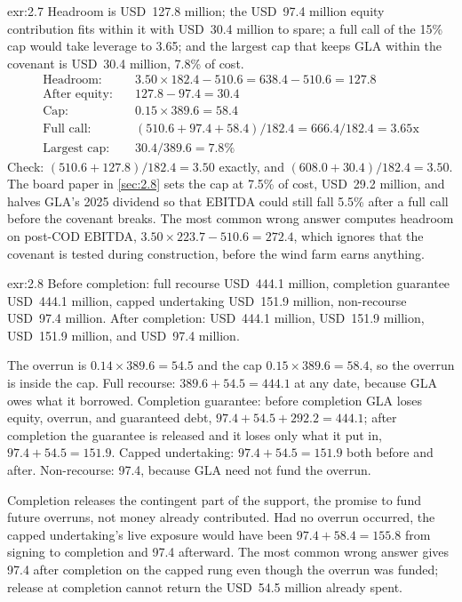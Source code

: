 \begin{solution}{exr:2.7}
Headroom is USD~127.8 million; the USD~97.4 million equity contribution fits within it with USD~30.4 million to spare; a full call of the 15\% cap would take leverage to 3.65\x; and the largest cap that keeps GLA within the covenant is USD~30.4 million, 7.8\% of cost.
\begin{align*}
\text{Headroom:}\quad & 3.50 \times 182.4 - 510.6 = 638.4 - 510.6 = 127.8\\
\text{After equity:}\quad & 127.8 - 97.4 = 30.4\\
\text{Cap:}\quad & 0.15 \times 389.6 = 58.4\\
\text{Full call:}\quad & (510.6 + 97.4 + 58.4)/182.4 = 666.4/182.4 = 3.65\text{x}\\
\text{Largest cap:}\quad & 30.4 / 389.6 = 7.8\%
\end{align*}
Check: $(510.6 + 127.8)/182.4 = 3.50$\x{} exactly, and $(608.0 + 30.4)/182.4 = 3.50$\x. The board paper in \cref{sec:2.8} sets the cap at 7.5\% of cost, USD~29.2 million, and halves GLA's 2025 dividend so that EBITDA could still fall 5.5\% after a full call before the covenant breaks. The most common wrong answer computes headroom on post-COD EBITDA, $3.50 \times 223.7 - 510.6 = 272.4$, which ignores that the covenant is tested during construction, before the wind farm earns anything.
\end{solution}

\begin{solution}{exr:2.8}
Before completion: full recourse USD~444.1 million, completion guarantee USD~444.1 million, capped undertaking USD~151.9 million, non-recourse USD~97.4 million. After completion: USD~444.1 million, USD~151.9 million, USD~151.9 million, and USD~97.4 million.

The overrun is $0.14 \times 389.6 = 54.5$ and the cap $0.15 \times 389.6 = 58.4$, so the overrun is inside the cap. Full recourse: $389.6 + 54.5 = 444.1$ at any date, because GLA owes what it borrowed. Completion guarantee: before completion GLA loses equity, overrun, and guaranteed debt, $97.4 + 54.5 + 292.2 = 444.1$; after completion the guarantee is released and it loses only what it put in, $97.4 + 54.5 = 151.9$. Capped undertaking: $97.4 + 54.5 = 151.9$ both before and after. Non-recourse: 97.4, because GLA need not fund the overrun.

Completion releases the contingent part of the support, the promise to fund future overruns, not money already contributed. Had no overrun occurred, the capped undertaking's live exposure would have been $97.4 + 58.4 = 155.8$ from signing to completion and 97.4 afterward. The most common wrong answer gives 97.4 after completion on the capped rung even though the overrun was funded; release at completion cannot return the USD~54.5 million already spent.
\end{solution}

